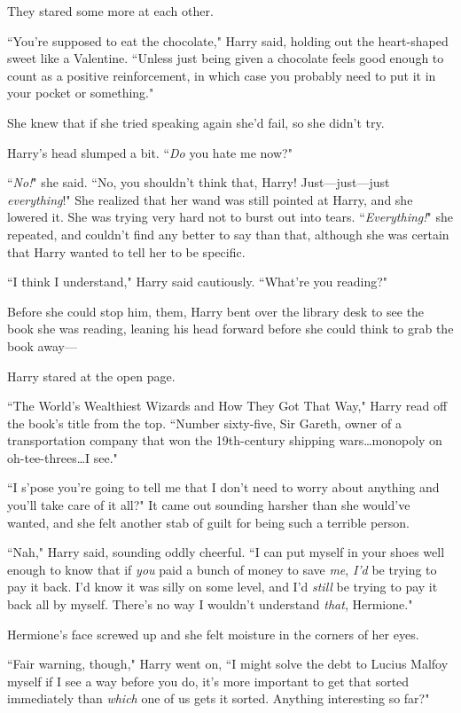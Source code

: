 They stared some more at each other.

``You're supposed to eat the chocolate," Harry said, holding out the heart-shaped sweet like a Valentine. ``Unless just being given a chocolate feels good enough to count as a positive reinforcement, in which case you probably need to put it in your pocket or something."

She knew that if she tried speaking again she'd fail, so she didn't try.

Harry's head slumped a bit. ``\emph{Do} you hate me now?"

``\emph{No!}" she said. ``No, you shouldn't think that, Harry! Just—just—just \emph{everything}!" She realized that her wand was still pointed at Harry, and she lowered it. She was trying very hard not to burst out into tears. ``\emph{Everything!}" she repeated, and couldn't find any better to say than that, although she was certain that Harry wanted to tell her to be specific.

``I think I understand," Harry said cautiously. ``What're you reading?"

Before she could stop him, them, Harry bent over the library desk to see the book she was reading, leaning his head forward before she could think to grab the book away—

Harry stared at the open page.

``The World's Wealthiest Wizards and How They Got That Way," Harry read off the book's title from the top. ``Number sixty-five, Sir Gareth, owner of a transportation company that won the 19th-century shipping wars…monopoly on oh-tee-threes…I see."

``I s'pose you're going to tell me that I don't need to worry about anything and you'll take care of it all?" It came out sounding harsher than she would've wanted, and she felt another stab of guilt for being such a terrible person.

``Nah," Harry said, sounding oddly cheerful. ``I can put myself in your shoes well enough to know that if \emph{you} paid a bunch of money to save \emph{me}, \emph{I'd} be trying to pay it back. I'd know it was silly on some level, and I'd \emph{still} be trying to pay it back all by myself. There's no way I wouldn't understand \emph{that}, Hermione."

Hermione's face screwed up and she felt moisture in the corners of her eyes.

``Fair warning, though," Harry went on, ``I might solve the debt to Lucius Malfoy myself if I see a way before you do, it's more important to get that sorted immediately than \emph{which} one of us gets it sorted. Anything interesting so far?"

